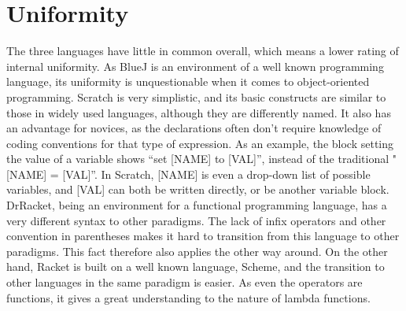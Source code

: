 \section{Uniformity}
\label{sec:uniformity}

The three languages have little in common overall, which means a lower rating of internal uniformity. As BlueJ is an environment of a well known programming language, its uniformity is unquestionable when it comes to object-oriented programming. Scratch is very simplistic, and its basic constructs are similar to those in widely used languages, although they are differently named. It also has an advantage for novices, as the declarations often don't require knowledge of coding conventions for that type of expression. As an example, the block setting the value of a variable shows ``set [NAME] to [VAL]'', instead of the traditional "[NAME] = [VAL]''. In Scratch, [NAME] is even a drop-down list of possible variables, and [VAL] can both be written directly, or be another variable block. DrRacket, being an environment for a functional programming language, has a very different syntax to other paradigms. The lack of infix operators and other convention in parentheses makes it hard to transition from this language to other paradigms. This fact therefore also applies the other way around. On the other hand, Racket is built on a well known language, Scheme, and the transition to other languages in the same paradigm is easier. As even the operators are functions, it gives a great understanding to the nature of lambda functions.